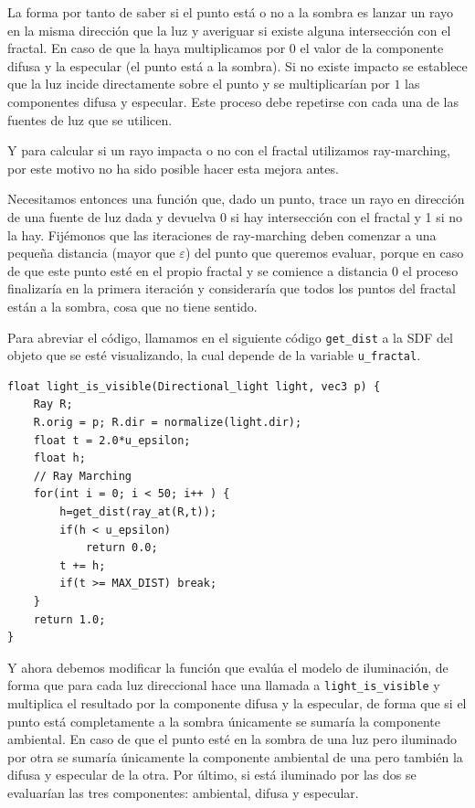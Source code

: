 La forma por tanto de saber si el punto está o no a la sombra es lanzar un rayo en la misma dirección que la luz y averiguar si existe alguna intersección con el fractal. En caso de que la haya multiplicamos por $0$ el valor de la componente difusa y la especular (el punto está a la sombra). Si no existe impacto se establece que la luz incide directamente sobre el punto y se multiplicarían por $1$ las componentes difusa y especular. Este proceso debe repetirse con cada una de las fuentes de luz que se utilicen.

Y para calcular si un rayo impacta o no con el fractal utilizamos ray-marching, por este motivo no ha sido posible hacer esta mejora antes. 

Necesitamos entonces una función que, dado un punto, trace un rayo en dirección de una fuente de luz dada y devuelva 0 si hay intersección con el fractal y 1 si no la hay. Fijémonos que las iteraciones de ray-marching deben comenzar a una pequeña distancia (mayor que $\varepsilon$) del punto que queremos evaluar, porque en caso de que este punto esté en el propio fractal y se comience a distancia $0$ el proceso finalizaría en la primera iteración y consideraría que todos los puntos del fractal están a la sombra, cosa que no tiene sentido. 

Para abreviar el código, llamamos en el siguiente código \verb|get_dist| a la SDF del objeto que se esté visualizando, la cual depende de la variable \verb|u_fractal|.
\begin{lstlisting}
float light_is_visible(Directional_light light, vec3 p) {
    Ray R;
    R.orig = p; R.dir = normalize(light.dir);
    float t = 2.0*u_epsilon;
    float h;
    // Ray Marching 
    for(int i = 0; i < 50; i++ ) {
        h=get_dist(ray_at(R,t));
        if(h < u_epsilon)
            return 0.0;
        t += h;
        if(t >= MAX_DIST) break;
    }
    return 1.0;
}
\end{lstlisting}

Y ahora debemos modificar la función que evalúa el modelo de iluminación, de forma que para cada luz direccional hace una llamada a \verb|light_is_visible| y multiplica el resultado por la componente difusa y la especular, de forma que si el punto está completamente a la sombra únicamente se sumaría la componente ambiental. En caso de que el punto esté en la sombra de una luz pero iluminado por otra se sumaría únicamente la componente ambiental de una pero también la difusa y especular de la otra. Por último, si está iluminado por las dos se evaluarían las tres componentes: ambiental, difusa y especular. 

